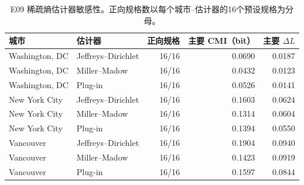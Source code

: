 \begin{table}[!htbp]
\caption{E09 稀疏熵估计器敏感性。正向规格数以每个城市--估计器的16个预设规格为分母。}
\label{tab:sup_estimator_specifications}
\centering
\footnotesize
\begin{tabular}{llrrr}
\toprule
\textbf{城市} & \textbf{估计器} & \textbf{正向规格} & \textbf{主要 CMI（bit）} & \textbf{主要 $\Delta L$}\\
\midrule
Washington, DC & Jeffreys--Dirichlet & 16/16 & 0.0690 & 0.0187\\
Washington, DC & Miller--Madow & 16/16 & 0.0432 & 0.0123\\
Washington, DC & Plug-in & 16/16 & 0.0526 & 0.0141\\
New York City & Jeffreys--Dirichlet & 16/16 & 0.1603 & 0.0624\\
New York City & Miller--Madow & 16/16 & 0.1314 & 0.0604\\
New York City & Plug-in & 16/16 & 0.1394 & 0.0550\\
Vancouver & Jeffreys--Dirichlet & 16/16 & 0.1904 & 0.0940\\
Vancouver & Miller--Madow & 16/16 & 0.1423 & 0.0919\\
Vancouver & Plug-in & 16/16 & 0.1597 & 0.0844\\
\bottomrule
\end{tabular}
\end{table}
